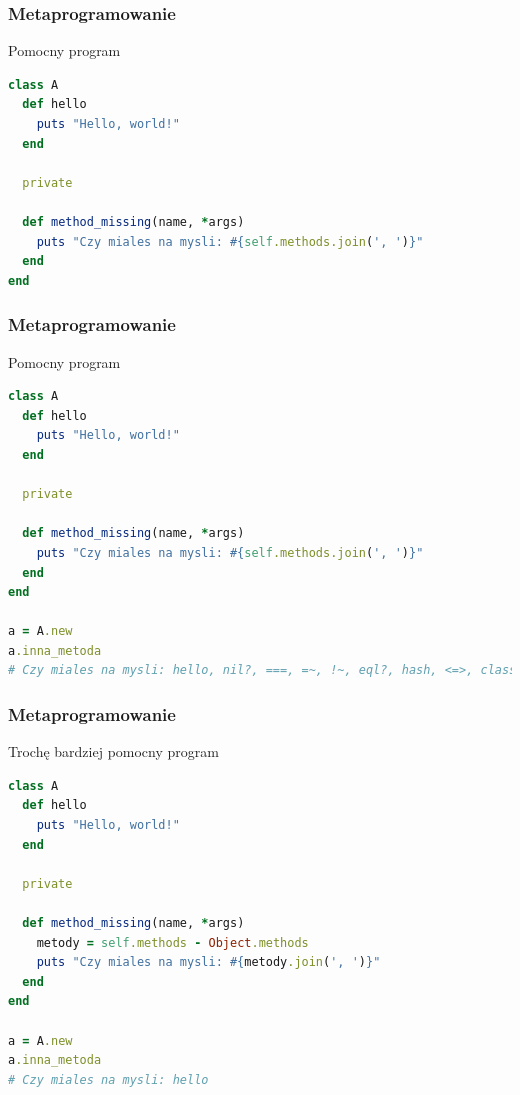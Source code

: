 \begin{frame}[fragile]
\frametitle{Metaprogramowanie}
\begin{block}{Pomocny program}
\begin{lstlisting}[language=Ruby]
class A
  def hello
    puts "Hello, world!"
  end

  private

  def method_missing(name, *args)
    puts "Czy miales na mysli: #{self.methods.join(', ')}"
  end
end
\end{lstlisting}
\end{block}
\end{frame}
\begin{frame}[fragile]
\frametitle{Metaprogramowanie}
\begin{block}{Pomocny program}
\begin{lstlisting}[language=Ruby,basicstyle=\tiny\ttfamily]
class A
  def hello
    puts "Hello, world!"
  end

  private

  def method_missing(name, *args)
    puts "Czy miales na mysli: #{self.methods.join(', ')}"
  end
end

a = A.new
a.inna_metoda
# Czy miales na mysli: hello, nil?, ===, =~, !~, eql?, hash, <=>, class, singleton_class, clone, dup, taint, tainted?, untaint, untrust, untrusted?, trust, freeze, frozen?, to_s, inspect, methods, singleton_methods, protected_methods, private_methods, public_methods, instance_variables, instance_variable_get, instance_variable_set, instance_variable_defined?, remove_instance_variable, instance_of?, kind_of?, is_a?, tap, send, public_send, respond_to?, extend, display, method, public_method, singleton_method, define_singleton_method, object_id, to_enum, enum_for, ==, equal?, !, !=, instance_eval, instance_exec, __send__, __id__
\end{lstlisting}
\end{block}
\end{frame}
\begin{frame}[fragile]
\frametitle{Metaprogramowanie}
\begin{block}{Trochę bardziej pomocny program}
\begin{lstlisting}[language=Ruby,basicstyle=\tiny\ttfamily]
class A
  def hello
    puts "Hello, world!"
  end

  private

  def method_missing(name, *args)
    metody = self.methods - Object.methods
    puts "Czy miales na mysli: #{metody.join(', ')}"
  end
end

a = A.new
a.inna_metoda
# Czy miales na mysli: hello
\end{lstlisting}
\end{block}
\end{frame}

